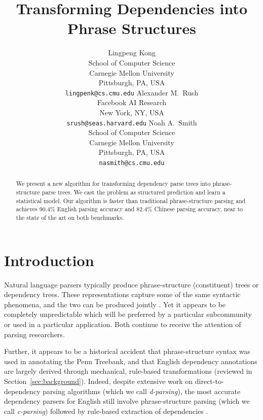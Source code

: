 \documentclass[11pt,letterpaper]{article}
\title{Transforming Dependencies into Phrase Structures }
\author{Lingpeng Kong\\
      School of Computer Science\\
  	Carnegie Mellon University\\
  	Pittsburgh, PA, USA\\
  {\tt lingpenk@cs.cmu.edu}
	  \And
      Alexander M.~Rush\\
	    Facebook AI Research \\
	    New York, NY, USA \\
	    {\tt srush@seas.harvard.edu}
	  \And
	Noah A.~Smith\\
      School of Computer Science\\
  	Carnegie Mellon University\\
  	Pittsburgh, PA, USA\\
  {\tt nasmith@cs.cmu.edu}}
\date{}
\newcommand{\nascomment}[1]{\textcolor{blue}{\bf \small [#1 --nas]}}
\begin{document}
\maketitle
\begin{abstract}
We present a new algorithm for transforming dependency parse trees into
phrase-structure parse trees.  We cast the problem as  structured
prediction and learn a statistical model.  Our algorithm is faster than traditional
phrase-structure parsing and achieves 90.4\% English parsing accuracy and 82.4\% Chinese parsing accuracy, near to the state of
the art on both benchmarks.




\end{abstract}

\section{Introduction}


Natural language parsers typically produce phrase-structure (constituent) trees or dependency trees.  These representations capture
some of the same syntactic phenomena, and the two can be produced
jointly \cite{klein2002fast,hall2008dependency,carreras2008tag,rush2010dual}.  Yet it
appears to be completely unpredictable which will be preferred by a
particular subcommunity or used in a particular application.  Both continue to receive the attention of
parsing researchers.


Further, it appears to be a historical accident that phrase-structure
syntax was used in annotating the Penn Treebank, and that English
dependency annotations are largely derived through mechanical,
rule-based transformations (reviewed in Section~\ref{sec:background}).  Indeed,
despite extensive work on direct-to-dependency parsing algorithms
(which we call \emph{d-parsing}), the most accurate dependency
parsers for English still involve phrase-structure parsing (which we
call \emph{c-parsing}) followed by rule-based extraction of
dependencies \cite{kong2014empirical}.
\end{document}
